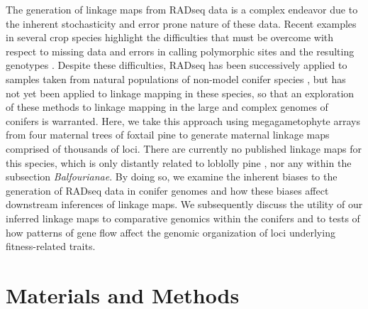 \documentclass[11pt]{article}
\begin{document}
The generation of linkage maps from RADseq data is a complex endeavor due to the inherent stochasticity
and error prone nature of these data. Recent examples in several crop species highlight the
difficulties that must be overcome with respect to missing data and errors in calling polymorphic sites 
and the resulting genotypes \citep{Pfender:2011, Ward:2013}. Despite these difficulties, RADseq has been 
successively applied to samples taken from natural populations of non-model conifer species \citep{Parchman:2012}, but has not yet 
been applied to linkage mapping in these species, so that an exploration of these methods to linkage mapping in the large and complex 
genomes of conifers is warranted. Here, we take this approach using megagametophyte arrays from four maternal trees of foxtail pine
to generate maternal linkage maps comprised of thousands of loci. There are currently no published linkage 
maps for this species, which is only distantly related to loblolly pine \citep{Eckert:2006a}, nor any within the subsection \textit{Balfourianae}. 
By doing so, we examine the inherent biases to the generation of RADseq data in conifer genomes and how these biases affect
downstream inferences of linkage maps. We subsequently discuss
the utility of our inferred linkage maps to comparative genomics within the conifers and to tests of how patterns of gene flow 
affect the genomic organization of loci underlying fitness-related traits.


\section*{Materials and Methods}\label{ss:mats}
\end{document}
